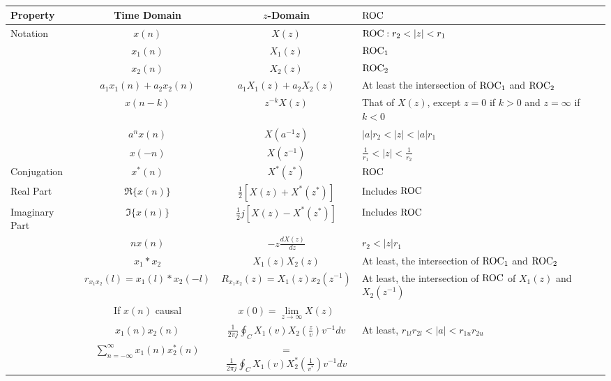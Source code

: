 \begin{table}[h!]
  \centering
  \begin{tabular}{p{4cm}ccp{5cm}}
    \toprule
    Property & Time Domain & $z$-Domain & $\operatorname{\mathrm{ROC}}$ \\
    \midrule
    Notation & $x(n)$ & $X(z)$ & $\operatorname{\mathrm{ROC}}: r_{2} < \lvert z \rvert < r_{1}$ \\
             & $x_{1}(n)$ & $X_{1}(z)$ & $\operatorname{\mathrm{ROC}}_{1}$ \\
             & $x_{2}(n)$ & $X_{2}(z)$ & $\operatorname{\mathrm{ROC}}_{2}$ \\
    \nameref{subsubsec:Linearity} & $a_{1}x_{1}(n) + a_{2}x_{2}(n)$ & $a_{1}X_{1}(z) + a_{2}X_{2}(z)$ & At least the intersection of $\operatorname{\mathrm{ROC}}_{1}$ and $\operatorname{\mathrm{ROC}}_{2}$ \\
    \nameref{subsubsec:Time Shifting} & $x(n-k)$ & $z^{-k}X(z)$ & That of $X(z)$, except $z=0$ if $k>0$ and $z=\infty$ if $k<0$ \\
    \nameref{subsubsec:Z-Domain Scaling} & $a^{n}x(n)$ & $X(a^{-1}z)$ & $\lvert a \rvert r_{2} < \lvert z \rvert < \lvert a \rvert r_{1}$ \\
    \nameref{subsubsec:Time Reversal} & $x(-n)$ & $X(z^{-1})$ & $\frac{1}{r_{1}} < \lvert z \rvert < \frac{1}{r_{2}}$ \\
    Conjugation & $x^{*}(n)$ & $X^{*}(z^{*})$ & $\operatorname{\mathrm{ROC}}$ \\
    Real Part & $\Re \lbrace x(n) \rbrace$ & $\frac{1}{2} \left[ X(z) + X^{*}(z^{*}) \right]$ & Includes $\operatorname{\mathrm{ROC}}$ \\
    Imaginary Part & $\Im \lbrace x(n) \rbrace$ & $\frac{1}{2} j \left[ X(z) - X^{*}(z^{*}) \right]$ & Includes $\operatorname{\mathrm{ROC}}$ \\
    \nameref{subsubsec:Z-Domain Differentiation} & $nx(n)$ & $-z \frac{dX(z)}{dz}$ & $r_{2} < \lvert z \rvert r_{1}$ \\
    \nameref{subsubsec:Z-Domain Convolutions} & $x_{1} * x_{2}$ & $X_{1}(z)X_{2}(z)$ & At least, the intersection of $\operatorname{\mathrm{ROC}}_{1}$ and $\operatorname{\mathrm{ROC}}_{2}$ \\
    \nameref{subsubsec:2 Sequence Correlation} & $r_{x_{1}x_{2}}(l) = x_{1}(l) * x_{2}(-l)$ & $R_{x_{1}x_{2}}(z) = X_{1}(z)x_{2}(z^{-1})$ & At least, the intersection of $\operatorname{\mathrm{ROC}}$ of $X_{1}(z)$ and $X_{2}(z^{-1})$ \\
    \nameref{subsubsec:Initial Value Theorem} & If $x(n)$ causal & $x(0) = \lim\limits_{z \rightarrow \infty} X(z)$ & \\
    \nameref{subsubsec:2 Sequence Multiplication} & $x_{1}(n)x_{2}(n)$ & $\frac{1}{2 \pi j} \oint_{C} X_{1}(v)X_{2}(\frac{z}{v}) v^{-1} dv$ & At least, $r_{1l}r_{2l} < \lvert a \rvert < r_{1u}r_{2u}$ \\
    \nameref{subsubsec:Parsevals Relation} & $\sum\limits_{n=-\infty}^{\infty} x_{1}(n)x_{2}^{*}(n)$ &= $\frac{1}{2 \pi j} \oint_{C} X_{1}(v)X_{2}^{*}(\frac{1}{v^{*}})v^{-1} dv$ & \\
    \bottomrule
  \end{tabular}
  \caption{}
  \label{tab:Z-Transform Properties}
\end{table}

